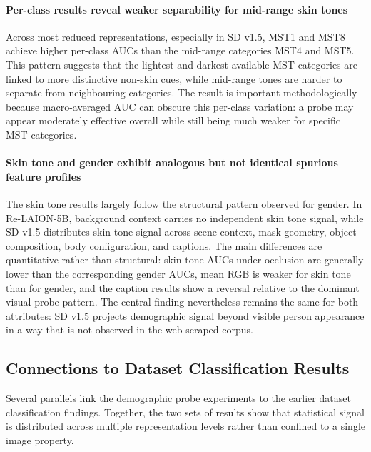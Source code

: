 \paragraph{Per-class results reveal weaker separability for mid-range skin tones}

Across most reduced representations, especially in SD v1.5, MST1 and MST8 achieve higher per-class AUCs than the mid-range categories MST4 and MST5. This pattern suggests that the lightest and darkest available MST categories are linked to more distinctive non-skin cues, while mid-range tones are harder to separate from neighbouring categories. The result is important methodologically because macro-averaged AUC can obscure this per-class variation: a probe may appear moderately effective overall while still being much weaker for specific MST categories.

\paragraph{Skin tone and gender exhibit analogous but not identical spurious feature profiles}

The skin tone results largely follow the structural pattern observed for gender. In Re-LAION-5B, background context carries no independent skin tone signal, while SD v1.5 distributes skin tone signal across scene context, mask geometry, object composition, body configuration, and captions. The main differences are quantitative rather than structural: skin tone AUCs under occlusion are generally lower than the corresponding gender AUCs, mean RGB is weaker for skin tone than for gender, and the caption results show a reversal relative to the dominant visual-probe pattern. The central finding nevertheless remains the same for both attributes: SD v1.5 projects demographic signal beyond visible person appearance in a way that is not observed in the web-scraped corpus.


\subsection{Connections to Dataset Classification Results}

Several parallels link the demographic probe experiments to the earlier dataset classification findings. Together, the two sets of results show that statistical signal is distributed across multiple representation levels rather than confined to a single image property.

